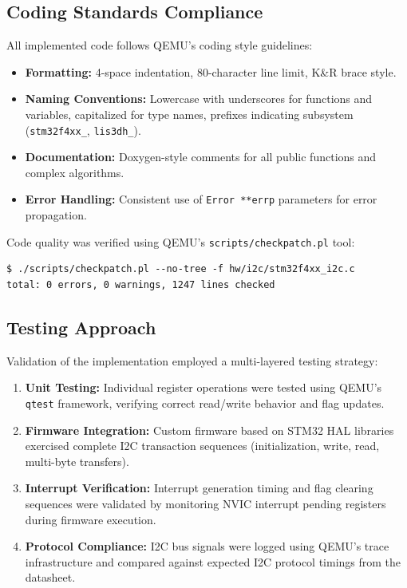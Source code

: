 \subsection{Coding Standards Compliance}

All implemented code follows QEMU's coding style guidelines:

\begin{itemize}
\item \textbf{Formatting:} 4-space indentation, 80-character line limit, K\&R brace style.
\item \textbf{Naming Conventions:} Lowercase with underscores for functions and variables, capitalized for type names, prefixes indicating subsystem (\texttt{stm32f4xx\_}, \texttt{lis3dh\_}).
\item \textbf{Documentation:} Doxygen-style comments for all public functions and complex algorithms.
\item \textbf{Error Handling:} Consistent use of \texttt{Error **errp} parameters for error propagation.
\end{itemize}

Code quality was verified using QEMU's \texttt{scripts/checkpatch.pl} tool:

\begin{verbatim}
$ ./scripts/checkpatch.pl --no-tree -f hw/i2c/stm32f4xx_i2c.c
total: 0 errors, 0 warnings, 1247 lines checked
\end{verbatim}

\subsection{Testing Approach}

Validation of the implementation employed a multi-layered testing strategy:

\begin{enumerate}
\item \textbf{Unit Testing:} Individual register operations were tested using QEMU's \texttt{qtest} framework, verifying correct read/write behavior and flag updates.

\item \textbf{Firmware Integration:} Custom firmware based on STM32 HAL libraries exercised complete I2C transaction sequences (initialization, write, read, multi-byte transfers).

\item \textbf{Interrupt Verification:} Interrupt generation timing and flag clearing sequences were validated by monitoring NVIC interrupt pending registers during firmware execution.

\item \textbf{Protocol Compliance:} I2C bus signals were logged using QEMU's trace infrastructure and compared against expected I2C protocol timings from the datasheet.
\end{enumerate}

